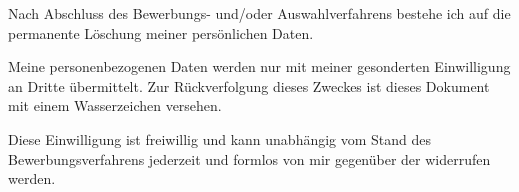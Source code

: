 ﻿\documentclass[
	a4paper,
	fontsize=12
]{scrartcl}
\begin{document}
Nach Abschluss des Bewerbungs- und/oder Auswahlverfahrens bestehe ich auf die permanente Löschung meiner persönlichen Daten.

Meine personenbezogenen Daten werden nur mit meiner gesonderten Einwilligung
an Dritte übermittelt. Zur Rückverfolgung dieses Zweckes ist dieses Dokument
mit einem Wasserzeichen versehen.

Diese Einwilligung ist freiwillig und kann unabhängig vom Stand des Bewerbungsverfahrens jederzeit und formlos von mir gegenüber der \RecpCompany{} widerrufen werden.

\begin{tiny}
\end{tiny}

\vfill\vfill
\MySignature
\vfill
\end{document}
